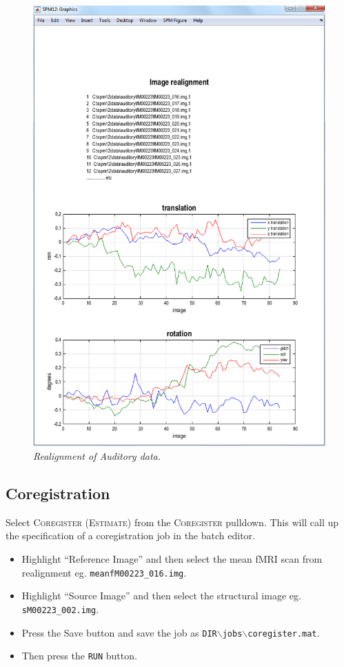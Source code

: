 \begin{figure}
\begin{center}
\includegraphics[width=125mm]{auditory/realign}
\caption{\em Realignment of Auditory data.\label{aud_realign}}
\end{center}
\end{figure}

\subsection{Coregistration}

Select \textsc{Coregister (Estimate)} from the \textsc{Coregister} pulldown. This will call up the specification of a coregistration job in the batch editor. 

\begin{itemize}
\item Highlight ``Reference Image'' and then select the mean fMRI scan from realignment eg. \texttt{meanfM00223\_016.img}.
\item Highlight ``Source Image'' and then select the structural image eg. \texttt{sM00223\_002.img}.
\item Press the Save button and save the job as \texttt{DIR$\backslash$jobs$\backslash$coregister.mat}.
\item Then press the \texttt{RUN} button.
\end{itemize}

